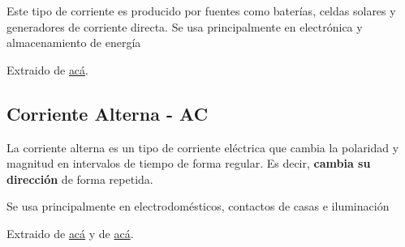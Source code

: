 Este tipo de corriente es producido por fuentes como baterías, celdas solares y generadores de corriente directa. Se usa principalmente en electrónica y almacenamiento de energía

Extraido de \href{https://www.clark.com.ar/todo-sobre-la-corriente-directa-principios-usos-y-ventajas/}{acá}.

\subsection{Corriente Alterna - AC}
La corriente alterna es un tipo de corriente eléctrica que cambia la polaridad y magnitud en intervalos de tiempo de forma regular. Es decir, \textbf{cambia su dirección} de forma repetida.

Se usa principalmente en electrodomésticos, contactos de casas e iluminación

Extraido de \href{https://universidadeuropea.com/blog/que-es-corriente-alterna/}{acá} y de \href{https://www.clark.com.ar/todo-sobre-la-corriente-directa-principios-usos-y-ventajas/}{acá}.